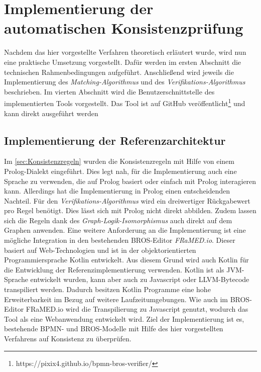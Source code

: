 \chapter{Implementierung der automatischen Konsistenzprüfung}
\label{chap:implementation}

Nachdem das hier vorgestellte Verfahren theoretisch erläutert wurde, wird nun eine praktische Umsetzung vorgestellt.
Dafür werden im ersten Abschnitt die technischen Rahmenbedingungen aufgeführt.
Anschließend wird jeweils die Implementierung des \emph{Matching-Algorithmus} und des \emph{Verifikations-Algorithmus} beschrieben.
Im vierten Abschnitt wird die Benutzerschnittstelle des implementierten Tools vorgestellt.
Das Tool ist auf GitHub veröffentlicht\footnote{https://pixix4.github.io/bpmn-bros-verifier/} und kann direkt ausgeführt werden

\section{Implementierung der Referenzarchitektur}

Im \cref{sec:Konsistenzregeln} wurden die Konsistenzregeln mit Hilfe von einem Prolog-Dialekt eingeführt.
Dies legt nah, für die Implementierung auch eine Sprache zu verwenden, die auf Prolog basiert oder einfach mit Prolog interagieren kann.
Allerdings hat die Implementierung in Prolog einen entscheidenden Nachteil.
Für den \emph{Verifikations-Algorithmus} wird ein dreiwertiger Rückgabewert pro Regel benötigt.
Dies lässt sich mit Prolog nicht direkt abbilden.
Zudem lassen sich die Regeln dank des \emph{Graph-Logik-Isomorphismus} auch direkt auf dem Graphen anwenden.
Eine weitere Anforderung an die Implementierung ist eine mögliche Integration in den bestehenden BROS-Editor \emph{FRaMED.io}.
Dieser basiert auf Web-Technologien und ist in der objektorientierten Programmiersprache Kotlin entwickelt.
Aus diesem Grund wird auch Kotlin für die Entwicklung der Referenzimplementierung verwenden.
Kotlin ist als JVM-Sprache entwickelt wurden, kann aber auch zu Javascript oder LLVM-Bytecode transpiliert werden.
Dadurch besitzen Kotlin Programme eine hohe Erweiterbarkeit im Bezug auf weitere Laufzeitumgebungen.
Wie auch im BROS-Editor FRaMED.io wird die Transpilierung zu Javascript genutzt, wodurch das Tool als eine Webanwendung entwickelt wird.
Ziel der Implementierung ist es, bestehende BPMN- und BROS-Modelle mit Hilfe des hier vorgestellten Verfahrens auf Konsistenz zu überprüfen.

